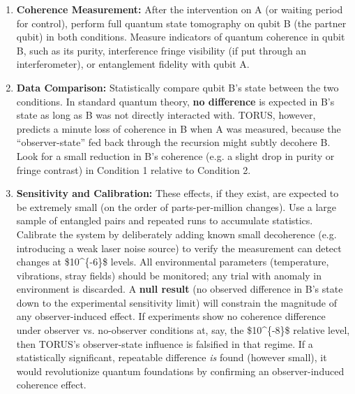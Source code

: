 \documentclass[
]{article}
\begin{document}
{\begin{enumerate}
  \begin{itemize}
  \item
    \emph{Condition 1 (Observer Influence):} Measure qubit A of each
    pair (e.g. perform a projective measurement in a chosen basis),
    simulating an ``observer'' interacting with that half of the pair.
  \item
    \emph{Condition 2 (Isolation Control):} Leave qubit A completely
    unmeasured and isolated in the same setup (no observer interaction),
    for the same duration as in Condition 1.
  \end{itemize}
\item
  \textbf{Coherence Measurement:} After the intervention on A (or
  waiting period for control), perform full quantum state tomography on
  qubit B (the partner qubit) in both conditions. Measure indicators of
  quantum coherence in qubit B, such as its purity, interference fringe
  visibility (if put through an interferometer), or entanglement
  fidelity with qubit A.
\item
  \textbf{Data Comparison:} Statistically compare qubit B's state
  between the two conditions. In standard quantum theory, \textbf{no
  difference} is expected in B's state as long as B was not directly
  interacted with. TORUS, however, predicts a minute loss of coherence
  in B when A was measured, because the ``observer-state'' fed back
  through the recursion might subtly decohere B\hspace{0pt}. Look for a
  small reduction in B's coherence (e.g. a slight drop in purity or
  fringe contrast) in Condition 1 relative to Condition 2.
\item
  \textbf{Sensitivity and Calibration:} These effects, if they exist,
  are expected to be extremely small (on the order of parts-per-million
  changes)\hspace{0pt}. Use a large sample of entangled pairs and
  repeated runs to accumulate statistics. Calibrate the system by
  deliberately adding known small decoherence (e.g. introducing a weak
  laser noise source) to verify the measurement can detect changes at
  \$10\^{}\{-6\}\$ levels. All environmental parameters (temperature,
  vibrations, stray fields) should be monitored; any trial with anomaly
  in environment is discarded. A \textbf{null result} (no observed
  difference in B's state down to the experimental sensitivity limit)
  will constrain the magnitude of any observer-induced effect. If
  experiments show no coherence difference under observer vs.
  no-observer conditions at, say, the \$10\^{}\{-8\}\$ relative level,
  then TORUS's observer-state influence is falsified in that
  regime\hspace{0pt}. If a statistically significant, repeatable
  difference \emph{is} found (however small), it would revolutionize
  quantum foundations by confirming an observer-induced coherence
  effect\hspace{0pt}.
\end{enumerate}

}
\end{document}
